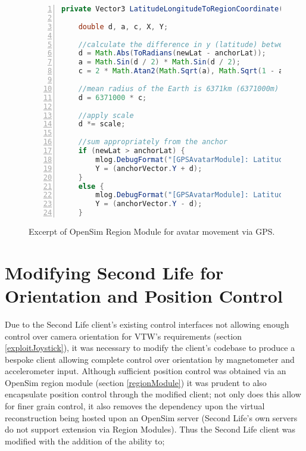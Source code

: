 \begin{figure}[h]
\begin{lstlisting}[language=Java, numbers=left, numberstyle=\small, stepnumber=1, frame=single, breaklines=true, backgroundcolor=\color{codebackground}, showstringspaces=false]
private Vector3 LatitudeLongitudeToRegionCoordinate(double newLat, double newLong, double anchorLat, double anchorLong, Vector3 anchorVector, double scale) {

    double d, a, c, X, Y;

    //calculate the difference in y (latitude) between the anchor & the new reading
    d = Math.Abs(ToRadians(newLat - anchorLat));
    a = Math.Sin(d / 2) * Math.Sin(d / 2);
    c = 2 * Math.Atan2(Math.Sqrt(a), Math.Sqrt(1 - a));

    //mean radius of the Earth is 6371km (6371000m)
    d = 6371000 * c;

    //apply scale
    d *= scale;

    //sum appropriately from the anchor
    if (newLat > anchorLat) {
        mlog.DebugFormat("[GPSAvatarModule]: LatitudeLongitudeToRegionCoordinate() - (Y) newLat > anchorLat.");
        Y = (anchorVector.Y + d);
    }
    else {
        mlog.DebugFormat("[GPSAvatarModule]: LatitudeLongitudeToRegionCoordinate() - (Y) newLat < anchorLat.");
        Y = (anchorVector.Y - d);
    }
\end{lstlisting}
\caption{Excerpt of OpenSim Region Module for avatar movement via GPS.}
\label{RegionModuleCode1}
\end{figure}




\section{Modifying Second Life for Orientation and Position Control}

Due to the Second Life client's existing control interfaces not allowing enough control over camera orientation for VTW's requirements (section \ref{exploitJoystick}), it was necessary to modify the client's codebase to produce a bespoke client allowing complete control over orientation by magnetometer and accelerometer input. Although sufficient position control was obtained via an OpenSim region module (section \ref{regionModule}) it was prudent to also encapsulate position control through the modified client; not only does this allow for finer grain control, it also removes the dependency upon the virtual reconstruction being hosted upon an OpenSim server (Second Life's own servers do not support extension via Region Modules). Thus the Second Life client was modified with the addition of the ability to;

